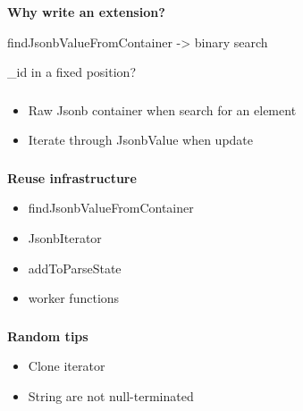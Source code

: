 \documentclass[usenames,dvipsnames, 18pt, compress, aspectratio=169]{beamer}
\begin{document}
\begin{frame}
    \frametitle{}
    \begin{center}
        \textbf{Why write an extension?}

        \vspace{1cm}
        \begin{flushleft}
            findJsonbValueFromContainer -> binary search

            \_id in a fixed position?
        \end{flushleft}

    \end{center}
\end{frame}

\begin{frame}
    \frametitle{}
    \begin{center}

        \begin{itemize}[label={\MVRightarrow}]
            \item Raw Jsonb container when search for an element
            \item Iterate through JsonbValue when update
        \end{itemize}

    \end{center}
\end{frame}

\begin{frame}
    \frametitle{}
    \begin{center}
        \textbf{Reuse infrastructure}

        \begin{itemize}[label={\MVRightarrow}]
            \item findJsonbValueFromContainer
            \item JsonbIterator
            \item addToParseState
            \item worker functions
        \end{itemize}

    \end{center}
\end{frame}

\begin{frame}
    \frametitle{}
    \begin{center}
        \textbf{Random tips}

        \begin{itemize}[label={\MVRightarrow}]
            \item Clone iterator
            \item String are not null-terminated
        \end{itemize}

    \end{center}
\end{frame}
\end{document}
